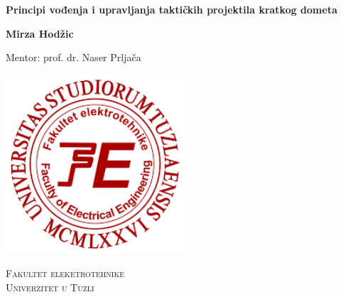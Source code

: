 \begin{titlepage}
    \begin{center}
        \vspace*{1cm}
        
        \Huge
        \textbf{Principi vođenja i upravljanja taktičkih projektila kratkog dometa}
        
        
        
        \vspace{1.5cm}
        
        \Large
        \textbf{Mirza Hodžic}\\
        
        \vspace{0.5cm}
        
        Mentor: prof. dr. Naser Prljača\\
        
        \vfill
        
        \includegraphics[width=0.5\textwidth]{Images/preuzmi.png}
        
        \vspace{0.8cm}
        
        
        \vspace{0.5cm}
        
        \LARGE
	    \textsc{Fakultet eleketrotehnike\\
	    Univerzitet u Tuzli}
	    
	    \begin{flushright}
	
	    \Large
	
	    \end{flushright}
        
    \end{center}
\end{titlepage}